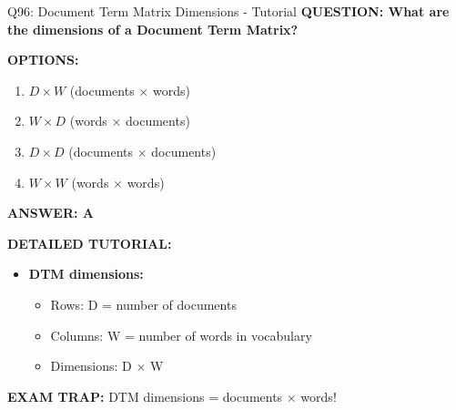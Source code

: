 \documentclass[8pt]{beamer}
\begin{document}
	\begin{frame}{Q96: Document Term Matrix Dimensions - Tutorial}
		\fontsize{6.5}{7.5}\selectfont
		\textbf{QUESTION: What are the dimensions of a Document Term Matrix?}
		
		\vspace{0.1cm}
		\textbf{OPTIONS:}
		\begin{enumerate}
			\item $D \times W$ (documents $\times$ words)
			\item $W \times D$ (words $\times$ documents)
			\item $D \times D$ (documents $\times$ documents)
			\item $W \times W$ (words $\times$ words)
		\end{enumerate}
		
		\vspace{0.1cm}
		\textcolor{myblue}{\textbf{ANSWER: A}}
		
		\vspace{0.1cm}
		\textbf{DETAILED TUTORIAL:}
		\begin{itemize}
			\item \textbf{DTM dimensions:}
			\begin{itemize}
				\item Rows: D = number of documents
				\item Columns: W = number of words in vocabulary
				\item Dimensions: D $\times$ W
			\end{itemize}
		\end{itemize}
		
		\textcolor{myred}{\textbf{EXAM TRAP:}} DTM dimensions = \textcolor{myblue}{documents $\times$ words}!
	\end{frame}
	
\end{document}
